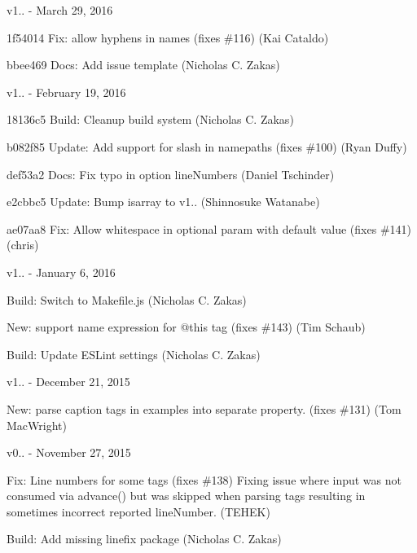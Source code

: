 v1.. -\/ March 29, 2016


\begin{DoxyItemize}
\item 1f54014 Fix\+: allow hyphens in names (fixes \#116) (Kai Cataldo)
\item bbee469 Docs\+: Add issue template (Nicholas C. Zakas)
\end{DoxyItemize}

v1.. -\/ February 19, 2016


\begin{DoxyItemize}
\item 18136c5 Build\+: Cleanup build system (Nicholas C. Zakas)
\item b082f85 Update\+: Add support for slash in namepaths (fixes \#100) (Ryan Duffy)
\item def53a2 Docs\+: Fix typo in option line\+Numbers (Daniel Tschinder)
\item e2cbbc5 Update\+: Bump isarray to v1.. (Shinnosuke Watanabe)
\item ae07aa8 Fix\+: Allow whitespace in optional param with default value (fixes \#141) (chris)
\end{DoxyItemize}

v1.. -\/ January 6, 2016


\begin{DoxyItemize}
\item Build\+: Switch to Makefile.\+js (Nicholas C. Zakas)
\item New\+: support name expression for @this tag (fixes \#143) (Tim Schaub)
\item Build\+: Update ESLint settings (Nicholas C. Zakas)
\end{DoxyItemize}

v1.. -\/ December 21, 2015


\begin{DoxyItemize}
\item New\+: parse caption tags in examples into separate property. (fixes \#131) (Tom Mac\+Wright)
\end{DoxyItemize}

v0.. -\/ November 27, 2015


\begin{DoxyItemize}
\item Fix\+: Line numbers for some tags (fixes \#138) Fixing issue where input was not consumed via advance() but was skipped when parsing tags resulting in sometimes incorrect reported line\+Number. (TEHEK)
\item Build\+: Add missing linefix package (Nicholas C. Zakas)
\end{DoxyItemize}

